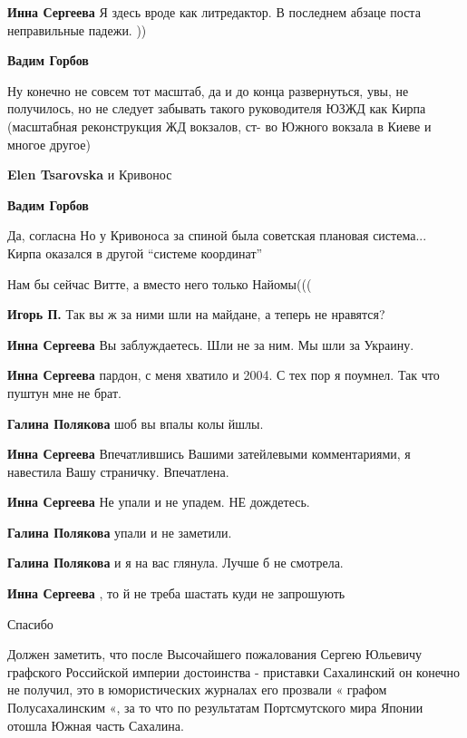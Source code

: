 \begin{itemize}
\begin{itemize}
\textbf{Инна Сергеева} Я здесь вроде как литредактор. В последнем абзаце поста неправильные падежи. ))

\textbf{Вадим Горбов} 

Ну конечно не совсем тот масштаб, да и до конца развернуться, увы, не
получилось, но не следует забывать такого руководителя ЮЗЖД как Кирпа
(масштабная реконструкция ЖД вокзалов, ст- во Южного вокзала в Киеве и многое
другое)


\textbf{Elen Tsarovska} и Кривонос

\textbf{Вадим Горбов} 

Да, согласна Но у Кривоноса за спиной была советская плановая система... Кирпа
оказался в другой \enquote{системе координат}

\end{itemize} %

Нам бы сейчас Витте, а вместо него только Найомы(((

\begin{itemize} %
\textbf{Игорь П.} Так вы ж за ними шли на майдане, а теперь не нравятся?

\textbf{Инна Сергеева} Вы заблуждаетесь. Шли не за ним. Мы шли за Украину.

\textbf{Инна Сергеева} пардон, с меня хватило и 2004. С тех пор я поумнел. Так что пуштун мне не брат.

\textbf{Галина Полякова} шоб вы впалы колы йшлы.

\textbf{Инна Сергеева} Впечатлившись Вашими затейлевыми комментариями, я навестила Вашу страничку. Впечатлена.

\textbf{Инна Сергеева} Не упали и не упадем. НЕ дождетесь.

\textbf{Галина Полякова} упали и не заметили.

\textbf{Галина Полякова} и я на вас глянула. Лучше б не смотрела.

\textbf{Инна Сергеева} , то й не треба шастать куди не запрошують
\end{itemize} %

Спасибо


Должен заметить, что после Высочайшего пожалования Сергею Юльевичу графского
Российской империи достоинства - приставки Сахалинский он конечно не получил,
это в юмористических журналах его прозвали « графом Полусахалинским «, за то
что по результатам Портсмутского мира Японии отошла Южная часть Сахалина.


\end{itemize}
